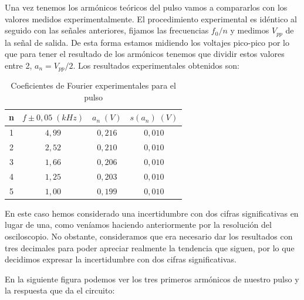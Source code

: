 \documentclass[a4paper,12pt,titlepage]{article}
\begin{document}
Una vez tenemos los armónicos teóricos del pulso vamos a compararlos con los valores medidos experimentalmente. El procedimiento experimental es idéntico al seguido con las señales anteriores, fijamos las frecuencias $f_0/n$ y medimos $V_{pp}$ de la señal de salida. De esta forma estamos midiendo los voltajes pico-pico por lo que para tener el resultado de los armónicos tenemos que dividir estos valores entre 2, $a_n = V_{pp}/2$. Los resultados experimentales obtenidos son:

\begin{table}[h!]
\centering
\begin{tabular}{|c|c|c|c|}
\hline
n & $f \pm 0,05 \;(kHz)$ & $a_n\;(V)$ & $s(a_n)\;(V)$ \\ \hline
1 & $4,99$ & $0,216$ & $0,010$\\ \hline
2 & $2,52$ & $0,210$ & $0,010$\\ \hline
3 & $1,66$ & $0,206$ & $0,010$\\ \hline
4 & $1,25$ & $0,203$ & $0,010$\\ \hline
5 & $1,00$ & $0,199$ & $0,010$\\ \hline
\end{tabular}
\caption{Coeficientes de Fourier experimentales para el pulso}
\label{tab:my-table}
\end{table}

En este caso hemos considerado una incertidumbre con dos cifras significativas en lugar de una, como veníamos haciendo anteriormente por la resolución del osciloscopio. No obstante, consideramos que era necesario dar los resultados con tres decimales para poder apreciar realmente la tendencia que siguen, por lo que decidimos expresar la incertidumbre con dos cifras significativas.

En la siguiente figura podemos ver los tres primeros armónicos de nuestro pulso y la respuesta que da el circuito:

\newpage
\end{document}
